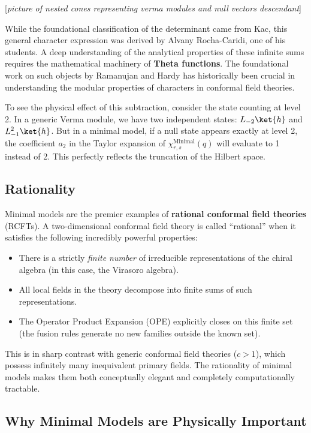     [\textit{picture of nested cones representing verma modules and null vectors descendant}]

While the foundational classification of the determinant came from Kac, this general character expression was derived by Alvany Rocha-Caridi, one of his students. A deep understanding of the analytical properties of these infinite sums requires the mathematical machinery of \textbf{Theta functions}. The foundational work on such objects by Ramanujan and Hardy has historically been crucial in understanding the modular properties of characters in conformal field theories.

To see the physical effect of this subtraction, consider the state counting at level 2. In a generic Verma module, we have two independent states: \(L_{-2}\ket{h}\) and \(L_{-1}^2\ket{h}\). But in a minimal model, if a null state appears exactly at level 2, the coefficient \(a_2\) in the Taylor expansion of \(\chi_{r,s}^{\mathrm{Minimal}}(q)\) will evaluate to 1 instead of 2. This perfectly reflects the truncation of the Hilbert space.

\subsection{Rationality}

Minimal models are the premier examples of \textbf{rational conformal field theories} (RCFTs). A two-dimensional conformal field theory is called ``rational'' when it satisfies the following incredibly powerful properties:
\begin{itemize}
    \item There is a strictly \textit{finite number} of irreducible representations of the chiral algebra (in this case, the Virasoro algebra).
    \item All local fields in the theory decompose into finite sums of such representations.
    \item The Operator Product Expansion (OPE) explicitly closes on this finite set (the fusion rules generate no new families outside the known set).
\end{itemize}

This is in sharp contrast with generic conformal field theories (\(c > 1\)), which possess infinitely many inequivalent primary fields. The rationality of minimal models makes them both conceptually elegant and completely computationally tractable.

\subsection{Why Minimal Models are Physically Important}


